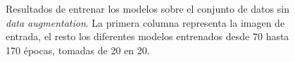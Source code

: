\begin{figure}[H]
\centering
    \caption{Resultados de entrenar los modelos sobre el conjunto de datos sin \textit{data augmentation}. La primera columna representa la imagen de entrada, el resto los diferentes modelos entrenados desde 70 hasta 170 épocas, tomadas de 20 en 20.} 
    \label{fig:synthetic_molecules}
\end{figure}

